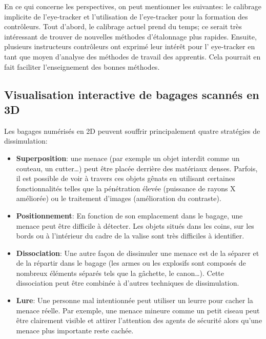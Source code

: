 En ce qui concerne les perspectives, on peut mentionner les suivantes:
le calibrage implicite de l'eye-tracker et l'utilisation de l'eye-tracker pour la formation des contrôleurs. Tout d'abord, le calibrage actuel prend du temps; ce serait très intéressant de trouver de
nouvelles méthodes d'étalonnage plus rapides. Ensuite, plusieurs instructeurs
contrôleurs ont exprimé leur intérêt pour l' eye-tracker en tant que
moyen d'analyse des méthodes de travail des apprentis. Cela pourrait en fait faciliter l'enseignement des bonnes méthodes. 

\subsection{Visualisation interactive de bagages scannés en 3D}
Les bagages numérisés en 2D peuvent souffrir principalement quatre stratégies de dissimulation:
\begin{itemize}

\item \textbf{Superposition}: une menace (par exemple un objet interdit comme un couteau, un cutter…) peut être placée derrière des matériaux denses. Parfois, il est possible de voir à travers ces objets gênats en utilisant certaines fonctionnalités telles que la pénétration élevée (puissance de rayons X améliorée) ou le traitement d'images (amélioration du contraste). 

\item \textbf{Positionnement}: En fonction de son emplacement dans le bagage, une menace peut être difficile à détecter. Les objets situés dans les coins, sur les bords ou à l'intérieur du cadre de la valise sont très difficiles à identifier.

\item \textbf{Dissociation}: Une autre façon de dissimuler une menace est de la séparer et de la répartir dans le bagage (les armes ou les explosifs sont composés de nombreux éléments séparés tels que la gâchette, le canon…). Cette dissociation peut être combinée à d'autres techniques de dissimulation.

\item \textbf{Lure}: Une personne mal intentionnée peut utiliser un leurre pour cacher la menace réelle. Par exemple, une menace mineure comme un petit ciseau peut être clairement visible et attirer l'attention des agents de sécurité alors qu'une menace plus importante reste cachée.

\end{itemize}

